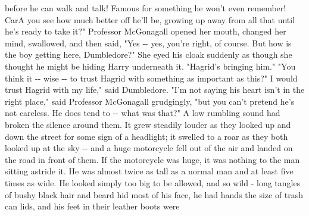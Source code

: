 \documentclass{article}%
\begin{document}
before he can walk and talk! Famous for something he won't even
\newline%
remember! CarA you see how much better off he'll be, growing up away
\newline%
from all that until he's ready to take it?"
\newline%
Professor McGonagall opened her mouth, changed her mind, swallowed, and
\newline%
then said, "Yes {-}{-} yes, you're right, of course. But how is the boy
\newline%
getting here, Dumbledore?" She eyed his cloak suddenly as though she
\newline%
thought he might be hiding Harry underneath it.
\newline%
"Hagrid's bringing him."
\newline%
"You think it {-}{-} wise {-}{-} to trust Hagrid with something as important as
\newline%
this?"
\newline%
I would trust Hagrid with my life," said Dumbledore.
\newline%
"I'm not saying his heart isn't in the right place," said Professor
\newline%
McGonagall grudgingly, "but you can't pretend he's not careless. He does
\newline%
tend to {-}{-} what was that?"
\newline%
A low rumbling sound had broken the silence around them. It grew
\newline%
steadily louder as they looked up and down the street for some sign of a
\newline%
headlight; it swelled to a roar as they both looked up at the sky {-}{-} and
\newline%
a huge motorcycle fell out of the air and landed on the road in front of
\newline%
them.
\newline%
If the motorcycle was huge, it was nothing to the man sitting astride
\newline%
it. He was almost twice as tall as a normal man and at least five times
\newline%
as wide. He looked simply too big to be allowed, and so wild {-} long
\newline%
tangles of bushy black hair and beard hid most of his face, he had hands
\newline%
the size of trash can lids, and his feet in their leather boots were
\end{document}
